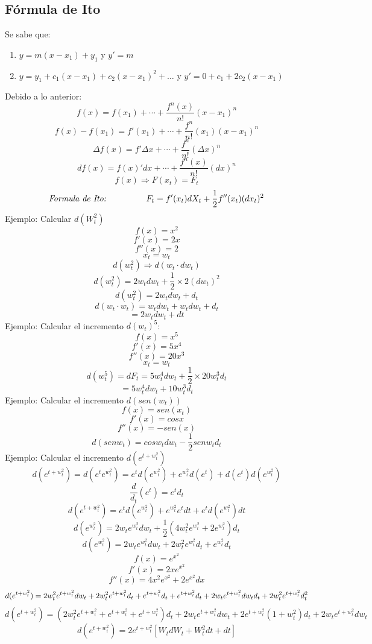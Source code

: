 \documentclass[11pt,fleqn]{book} %
\numberwithin{equation}{section} %
\numberwithin{figure}{section} %
\numberwithin{table}{section} %
\begin{document}
\subsection{Fórmula de Ito}
Se sabe que:
\begin{enumerate}
    \item $y=m(x-x_{1})+y_{1}$ y ${y}'=m$
    \item $y=y_{1}+c_{1}(x-x_{1})+c_{2}(x-x_{1})^2+ \dots$ y ${y}' = 0+c_{1}+2c_{2}(x-x_{1})$
\end{enumerate}
Debido a lo anterior:
$$f(x)=f(x_1)+\cdots +\frac{f^n(x)}{n!}(x-x_1)^n$$
$$f(x)-f(x_1)={f}'(x_1)+\cdots+\frac{f^n}{n!}(x_1)(x-x_1)^n$$
$$\Delta f(x)={f}'\Delta x+\cdots +\frac{f^n}{n!}(\Delta x)^n$$
$$df(x)={f(x)}'dx+\cdots +\frac{f^n(x)}{n!}(dx)^n$$
$$f(x)\Rightarrow F(x_t)=F_t$$
\begin{align} 
\begin{split}
\textit{Formula de Ito:\:\:\:\:\:\:\:\:\:\:\:\:\:\:\:\:\:\:\:\:\:}F_{t}={f}'(x_{t})dX_{t} + \frac{1}{2}{f}''(x_{t})(dx_{t})^2
\end{split}					
\end{align}
Ejemplo: Calcular $d(W_{t}^2)$
$$f(x)=x^2$$
$${f}'(x)=2x$$
$${f}''(x)=2$$
$$x_t=w_t$$
$$d(w_t^2)\Rightarrow d(w_t\cdot dw_t)$$
$$d(w_t^2)=2w_tdw_t+\frac{1}{2}\times 2(dw_t)^2$$
$$d(w_t^2)=2w_tdw_t+d_t$$
$$d(w_t\cdot w_t)=w_tdw_t+w_tdw_t+d_t$$
$$=2w_{t}dw_{t}+dt$$
Ejemplo: Calcular el incremento $d(w_t)^5$:
$$f(x)=x^5$$
$${f}'(x)=5x^4$$
$${f}''(x)=20x^3$$
$$x_t=w_t$$
$$d(w_t^5)=dF_t=5w_t^4dw_t+\frac{1}{2}\times 20w_t^3d_t$$
$$=5w_t^4dw_t+10w_t^3d_t$$
Ejemplo: Calcular el incremento  $d(sen(w_{t}))$
$$f(x)=sen(x_t)$$
$${f}'(x)=cosx$$
$${f}''(x)=-sen(x)$$
$$d(senw_t)=cosw_tdw_t-\frac{1}{2}senw_td_t$$
Ejemplo: Calcular el incremento $d(e^{t+w_{t}^2})$
$$d(e^{t+w_t^2})=d(e^t e^{w_t^2})=e^td(e^{w_t^2})+e^{w_{t}^{2}}d(e^{t})+d(e^t)d(e^{w_t^2})$$
$$\frac{d}{d_t}(e^t)=e^t d_{t}$$
$$d(e^{t+w_t^2}) = e^td(e^{w_t^2}) + e^{w_t^2}e^tdt + e^{t}d(e^{w_{t}^{2}})dt$$
$$d(e^{w_t^2})=2w_te^{w_t^2}dw_t+\frac{1}{2}(4w_t^2e^{w_t^2}+2e^{w_t^2})d_t$$
$$d(e^{w_t^2})=2w_te^{w_t^2}dw_t+2w_t^2e^{w_t^2}d_t+e^{w_t^2}d_t$$
$$f(x)=e^{x^2}$$
$${f}'(x)=2xe^{x^2}$$
$${f}''(x)=4x^{2} e^{x^{2}} + 2e^{x^2} dx$$
$$d(e^{t+w_t^2})=2w_t^2e^{t+w_t^2}dw_t+2w_t^2e^{t+w_t^2}d_t+e^{t+\\
w_t^2}d_t+e^{t+w_t^2}d_t+2w_te^{t+w_t^2}dw_td_t+2w_t^2e^{t+w_t^2}d_t^2$$
$$d(e^{t+w_t^2})=(2w_t^2e^{t+w_t^2}+e^{t+w_t^2}+e^{t+w_t^2})d_t+2w_te^{t+w_t^2}dw_t+2e^{t+w_t^2}(1+w_t^2)d_t+2w_te^{t+w_t^2}dw_t$$
$$ d(e^{t+w_t^2}) = 2e^{t+w_t^2}[W_{t}dW_{t} + W_{t}^{2} dt + dt]  $$
\end{document}
